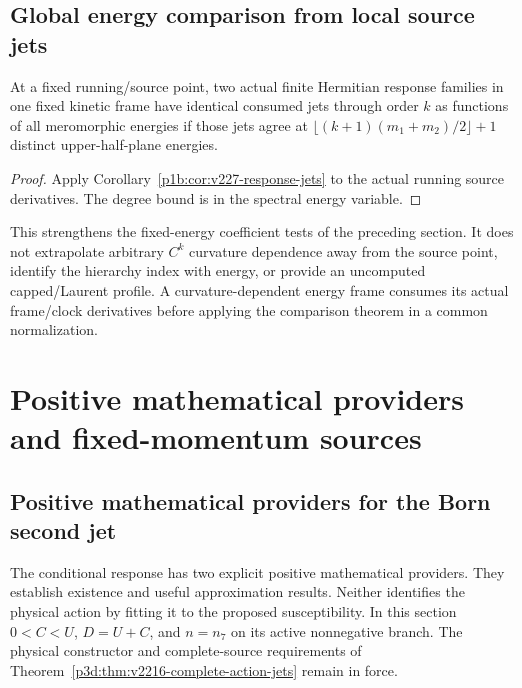 \documentclass[12pt,a4paper]{article}
\begin{document}
\subsection{Global energy comparison from local source jets}
\label{p3d:sec:v227-running-frequency}
\begin{corollary}
\label{p3d:cor:v227-running-frequency}
At a fixed running/source point, two actual finite Hermitian response
families in one fixed kinetic frame have identical consumed jets through
order $k$ as functions of all meromorphic energies if those jets agree at
$\lfloor(k+1)(m_1+m_2)/2\rfloor+1$ distinct upper-half-plane energies.
\end{corollary}
\begin{proof}
Apply Corollary~\ref{p1b:cor:v227-response-jets} to the actual running
source derivatives. The degree bound is in the spectral energy variable.
\end{proof}
This strengthens the fixed-energy coefficient tests of the preceding
section. It does not extrapolate arbitrary $C^k$ curvature dependence
away from the source point, identify the hierarchy index with energy,
or provide an uncomputed capped/Laurent profile. A curvature-dependent
energy frame consumes its actual frame/clock derivatives before applying
the comparison theorem in a common normalization.


\section{Positive mathematical providers and fixed-momentum sources}
\label{paper3d:sec:organized-providers}
\subsection{Positive mathematical providers for the Born second jet}
\label{p3d:sec:v2216-positive-born-provider}

The conditional response has two explicit positive mathematical providers.
They establish existence and useful approximation results. Neither identifies
the physical action by fitting it to the proposed susceptibility. In this
section $0<C<U$, $D=U+C$, and $n=n_7$ on its active nonnegative branch.
The physical constructor and complete-source requirements of
Theorem~\ref{p3d:thm:v2216-complete-action-jets} remain in force.
\end{document}
